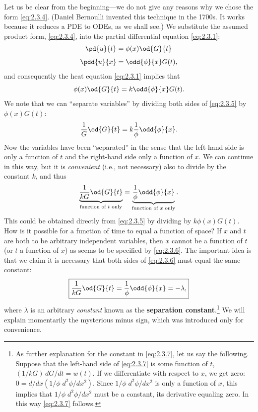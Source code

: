 Let us be clear from the beginning---we do not give any reasons why we chose the form \eqref{eq:2.3.4}. (Daniel Bernoulli invented this technique in the 1700s. It works because it reduces a PDE to ODEs, as we shall see.) We substitute the assumed product form, \eqref{eq:2.3.4}, into the partial differential equation \eqref{eq:2.3.1}:
\begin{align*}
\pd{u}{t} &= \phi(x)\od{G}{t} \\[4pt]
\pdd{u}{x} &= \odd{\phi}{x} G(t),
\end{align*}
and consequently the heat equation \eqref{eq:2.3.1} implies that
\begin{equation}
\label{eq:2.3.5}
\phi(x)\od{G}{t} = k\odd{\phi}{x} G(t).
\end{equation}
We note that we can ``separate variables'' by dividing both sides of \eqref{eq:2.3.5} by $\phi(x)G(t)$:
\[
\frac{1}{G}\od{G}{t} = k\frac{1}{\phi}\odd{\phi}{x}.
\]
Now the variables have been ``separated'' in the sense that the left-hand side is only a function of $t$ and the right-hand side only a function of $x$. We can continue in this way, but it is \emph{convenient} (i.e., not necessary) also to divide by the constant $k$, and thus
\begin{equation}
\label{eq:2.3.6}
\underbrace{\frac{1}{kG}\od{G}{t}}_{\text{function of $t$ only}} = \underbrace{\frac{1}{\phi}\odd{\phi}{x}}_{\text{function of $x$ only}}.
\end{equation}
This could be obtained directly from \eqref{eq:2.3.5} by dividing by $k\phi(x)G(t)$. How is it possible for a function of time to equal a function of space? If $x$ and $t$ are both to be arbitrary independent variables, then $x$ cannot be a function of $t$ (or $t$ a function of $x$) as seems to be specified by \eqref{eq:2.3.6}. The important idea is that we claim it is necessary that both sides of \eqref{eq:2.3.6} must equal the same constant:
\begin{equation}
\label{eq:2.3.7}
\boxed{\frac{1}{kG}\od{G}{t} = \frac{1}{\phi}\odd{\phi}{x} = -\lambda,}
\end{equation}
where $\lambda$ is an arbitrary \emph{constant} known as the \textbf{separation constant}.\footnote{As further explanation for the constant in \eqref{eq:2.3.7}, let us say the following. Suppose that the left-hand side of \eqref{eq:2.3.7} is some function of $t$, $(1/kG)\,dG/dt = w(t)$. If we differentiate with respect to $x$, we get zero: $0 = d/dx(1/\phi\;d^2\phi/dx^2)$. Since $1/\phi\;d^2\phi/dx^2$ is only a function of $x$, this implies that $1/\phi\;d^2\phi/dx^2$ must be a constant, its derivative equaling zero. In this way \eqref{eq:2.3.7} follows.} We will explain momentarily the mysterious minus sign, which was introduced only for convenience.

